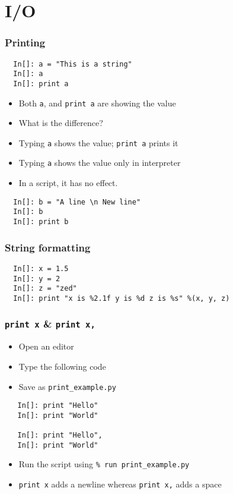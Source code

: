 \section{I/O}

\begin{frame}[fragile]
  \frametitle{Printing}
  \begin{lstlisting}
  In[]: a = "This is a string"
  In[]: a
  In[]: print a
  \end{lstlisting}
  \begin{itemize}
  \item Both \texttt{a}, and \texttt{print a} are showing the value
  \item What is the difference?
  \item Typing \texttt{a} shows the value; \texttt{print a} prints it
  \item Typing \texttt{a} shows the value only in interpreter
  \item In a script, it has no effect. 
  \end{itemize}
  \begin{lstlisting}
  In[]: b = "A line \n New line"
  In[]: b
  In[]: print b
  \end{lstlisting}
\end{frame}

\begin{frame}[fragile]
  \frametitle{String formatting}
  \small
  \begin{lstlisting}
  In[]: x = 1.5
  In[]: y = 2
  In[]: z = "zed"
  In[]: print "x is %2.1f y is %d z is %s" %(x, y, z)
  \end{lstlisting}
\end{frame}

\begin{frame}[fragile]
  \frametitle{\texttt{print x} \& \texttt{print x,}}
  \begin{itemize}
  \item Open an editor
  \item Type the following code
  \item Save as \texttt{print\_example.py}
  \end{itemize}
  \begin{lstlisting}
   In[]: print "Hello"
   In[]: print "World"

   In[]: print "Hello",
   In[]: print "World"
  \end{lstlisting}
  \begin{itemize}
  \item Run the script using \texttt{\% run print\_example.py}
  \item \texttt{print x} adds a newline whereas \texttt{print x,} adds
    a space
  \end{itemize}
\end{frame}

